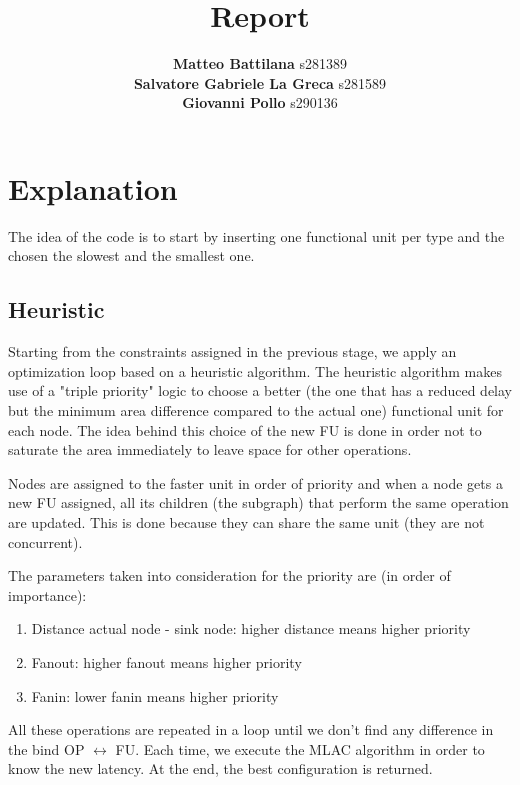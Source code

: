 \documentclass{article}
\title{\Huge Report}
\author{
\large \textbf{Matteo Battilana} s281389 \\
\large \textbf{Salvatore Gabriele La Greca} s281589 \\
\large \textbf{Giovanni Pollo} s290136}
\date{}
\begin{document}
\begin{titlepage}
    \centering
    \vspace{2px}
  \end{titlepage}
  \maketitle
  \thispagestyle{empty}

  \newpage

  \thispagestyle{empty}

  \section{Explanation}

  The idea of the code is to start by inserting one functional unit per type and the chosen the slowest and the smallest one. 

  \subsection{Heuristic}

  Starting from the constraints assigned in the previous stage, we apply an optimization loop based on a heuristic algorithm. The heuristic algorithm makes use of a "triple priority" logic to choose a better (the one that has a reduced delay but the minimum area difference compared to the actual one) functional unit for each node. The idea behind this choice of the new FU is done in order not to saturate the area immediately to leave space for other operations.

  Nodes are assigned to the faster unit in order of priority and when a node gets a new FU assigned, all its children (the subgraph) that perform the same operation are updated. This is done because they can share the same unit (they are not concurrent).

  The parameters taken into consideration for the priority are (in order of importance):

  \begin{enumerate}
    \item Distance actual node - sink node: higher distance means higher priority
    \item Fanout: higher fanout means higher priority
    \item Fanin: lower fanin means higher priority
  \end{enumerate}

  All these operations are repeated in a loop until we don't find any difference in the bind OP $\leftrightarrow$ FU. Each time, we execute the MLAC algorithm in order to know the new latency. At the end, the best configuration is returned.
\end{document}
